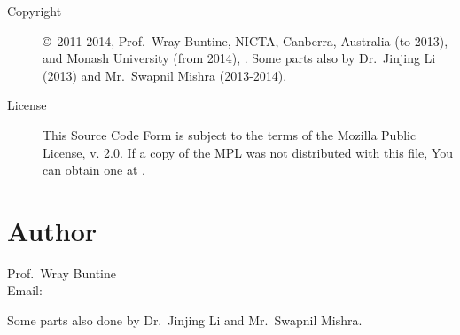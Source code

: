 \documentclass[a4paper,english]{article}
\begin{document}
\begin{description}
\item[Copyright] \copyright\ 2011-2014, Prof.~Wray Buntine, 
  NICTA, Canberra, Australia (to 2013), and Monash
University (from 2014),
     .
Some parts also by Dr.\ Jinjing Li (2013) and 
Mr.\ Swapnil Mishra (2013-2014).

\item[License]  This Source Code Form is subject to the terms of the Mozilla 
 Public License, v. 2.0. If a copy of the MPL was not
 distributed with this file, You can obtain one at
      .
\end{description}

\section{Author}

\noindent
Prof.~Wray Buntine                     \\
Email:   

Some parts also done by Dr.\ Jinjing Li and 
Mr.\ Swapnil Mishra.

\LatexManEnd
\end{document}
